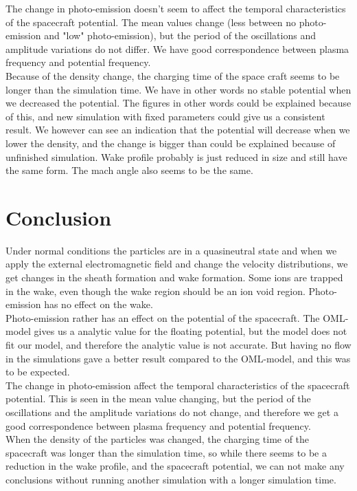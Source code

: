 \documentclass[aip, 
rsi, 
amsmath,
amssymb,
longbibliography,
preprint]{revtex4-1}
\begin{document}
The change in photo-emission doesn't seem to affect the temporal characteristics of the spacecraft potential. The mean values change (less between no photo-emission and "low" photo-emission), but the period of the oscillations and amplitude variations do not differ. We have good correspondence between plasma frequency and potential frequency.\\

Because of the density change, the charging time of the space craft seems to be longer than the simulation time. We have in other words no stable potential when we decreased the potential. The figures in other words could be explained because of this, and new simulation with fixed parameters could give us a consistent result. We however can see an indication that the potential will decrease when we lower the density, and the change is bigger than could be explained because of unfinished simulation. Wake profile probably is just reduced in size and still have the same form. The mach angle also seems to be the same. 

\section{Conclusion}
Under normal conditions the particles are in a quasineutral state and when we apply the external electromagnetic field and change the velocity distributions, we get changes in the sheath formation and wake formation. Some ions are trapped in the wake, even though the wake region should be an ion void region. Photo-emission has no effect on the wake. \\

Photo-emission rather has an effect on the potential of the spacecraft. The OML-model gives us a analytic value for the floating potential, but the model does not fit our model, and therefore the analytic value is not accurate. But having no flow in the simulations gave a better result compared to the OML-model, and this was to be expected. \\

The change in photo-emission affect the temporal characteristics of the spacecraft potential. This is seen in the mean value changing, but the period of the oscillations and the amplitude variations do not change, and therefore we get a good correspondence between plasma frequency and potential frequency. \\

When the density of the particles was changed, the charging time of the spacecraft was longer than the simulation time, so while there seems to be a reduction in the wake profile, and the spacecraft potential, we can not make any conclusions without running another simulation with a longer simulation time.
\end{document}
